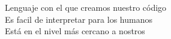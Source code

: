\documentclass[preview]{standalone}
\begin{document}
Lenguaje con el que creamos nuestro código\\Es facil de interpretar para los humanos\\Está en el nivel más cercano a nostros\\
\end{document}
